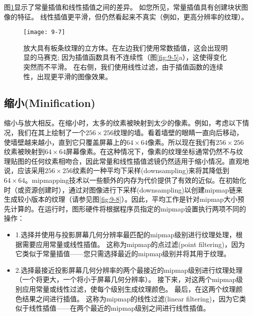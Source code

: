 \begin{flushleft}
图\ref{fig:9-7}显示了常量插值和线性插值之间的差异。 如您所见，常量插值具有创建块状图像的特征。 线性插值更平滑，但仍然看起来不真实（例如，更高分辨率的纹理）。\\
\end{flushleft}

\begin{figure}[h]
    \label{fig:9-7}
    \texttt{[image: 9-7]}
    \centering
    \caption{放大具有板条纹理的立方体。在左边我们使用常数插值，这会出现明显的马赛克; 因为插值函数具有不连续性（图\ref{fig:9-5}a），这使得变化突然而不平滑。 在右侧，我们使用线性过滤，由于插值函数的连续性，出现更平滑的图像效果。}
\end{figure}

\subsection{缩小(Minification)}
\begin{flushleft}
缩小与放大相反。在缩小时，太多的纹素被映射到太少的像素。例如，考虑以下情况，我们在其上绘制了一个$256\times 256$纹理的墙。看着墙壁的眼睛一直向后移动，使墙壁越来越小，直到它只覆盖屏幕上的$64\times 64$像素。所以现在我们有$256\times 256$纹素被映射到$64\times 64$屏幕像素。在这种情况下，像素的纹理坐标通常仍然不与纹理贴图的任何纹素相吻合，因此常量和线性插值滤镜仍然适用于缩小情况。直观地说，应该采用$256\times 256$纹素的一种平均下采样(downsampling)来将其降低到$64\times 64$。mipmapping技术以一些额外的内存为代价提供了有效的近似。在初始化时（或资源创建时），通过对图像进行下采样(downsampling)以创建mipmap链来生成较小版本的纹理（请参见图\ref{fig:9-8}）。因此，平均工作是针对mipmap大小预先计算的。在运行时，图形硬件将根据程序员指定的mipmap设置执行两项不同的操作：\\
\end{flushleft}

\begin{itemize}
  \item 1.选择并使用与投影屏幕几何分辨率最匹配的mipmap级别进行纹理处理，根据需要应用常量或线性插值。 这称为mipmap的点过滤(point filtering)，因为它类似于常量插值——您只需选择最近的mipmap级别并将其用于纹理。
  \item 2.选择最接近投影屏幕几何分辨率的两个最接近的mipmap级别进行纹理处理（一个将更大，一个将小于屏幕几何分辨率）。 接下来，对这两个mipmap级别应用常量或线性过滤，使每个级别生成纹理颜色。 最后，在这两个纹理颜色结果之间进行插值。 这称为mipmap的线性过滤(linear filtering)，因为它类似于线性插值——在两个最近的mipmap级别之间进行线性插值。
\end{itemize}


